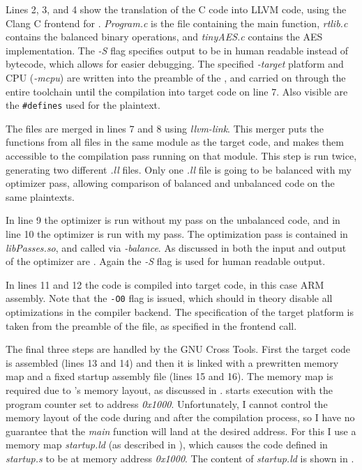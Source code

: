 Lines 2, 3, and 4 show the translation of the C code into LLVM code, using the Clang\cite{lattner2008llvm} C frontend for \llvm{}.
\emph{Program.c} is the file containing the main function, \emph{rtlib.c} contains the balanced binary operations, and \emph{tinyAES.c} contains the AES implementation.
The \emph{-S} flag specifies output to be in human readable \ir{} instead of bytecode, which allows for easier debugging.
The specified \emph{-target} platform and CPU (\emph{-mcpu}) are written into the preamble of the \ir{}, and carried on through the entire toolchain until the compilation into target code on line 7.
Also visible are the \texttt{\#defines} used for the plaintext.

The \ir{} files are merged in lines 7 and 8 using \emph{llvm-link}.
This merger puts the functions from all files in the same module as the target code, and makes them accessible to the compilation pass running on that module.
This step is run twice, generating two different \emph{.ll} files.
Only one \emph{.ll} file is going to be balanced with my optimizer pass, allowing comparison of balanced and unbalanced code on the same plaintexts.

In line 9 the \llvm{} optimizer is run without my pass on the unbalanced code, and in line 10 the optimizer is run with my pass.
The optimization pass is contained in \emph{libPasses.so}, and called via \emph{-balance}.
As discussed in  both the input and output of the optimizer are \ir{}.
Again the \emph{-S} flag is used for human readable output.

In lines 11 and 12 the \ir{} code is compiled into target code, in this case ARM assembly.
Note that the \texttt{-O0} flag is issued, which should in theory disable all optimizations in the compiler backend.
The specification of the target platform is taken from the preamble of the \ir{} file, as specified in the frontend call.

The final three steps are handled by the GNU Cross Tools.
First the target code is assembled (lines 13 and 14) and then it is linked with a prewritten memory map and a fixed startup assembly file (lines 15 and 16).
The memory map is required due to \qemu{}'s memory layout, as discussed in .
\qemu{} starts execution with the program counter set to address \emph{0x1000}.
Unfortunately, I cannot control the memory layout of the code during and after the compilation process, so I have no guarantee that the \emph{main} function will land at the desired address.
For this I use a memory map \emph{startup.ld} (as described in \cite{armbare}), which causes the code defined in \emph{startup.s} to be at memory address \emph{0x1000}.
The content of \emph{startup.ld} is shown in .

